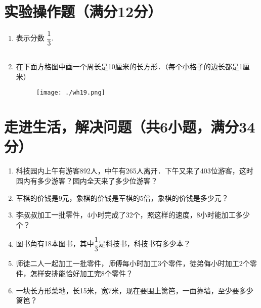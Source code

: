 \documentclass[12pt,twoside,space]{ctexart}
\begin{document}
    \newpage
    \section{实验操作题（满分12分）}
      \begin{enumerate}[itemsep=0.2em, topsep=0pt]
        \item 表示分数 $\dfrac{1}{3}$.\\[0.5em]
            \begin{tabular}{|l|l|l|l|l|l|l|l|l|l|l|l|}
            \hline
              \hspace{1em} & \hspace{1em} & \hspace{1em} & \hspace{1em} & \hspace{1em} & \hspace{1em} & \hspace{1em} & \hspace{1em} & \hspace{1em} & \hspace{1em} &  \hspace{1em} & \hspace{1em} \\ \hline
            \end{tabular}

          \item 在下面方格图中画一个周长是10厘米的长方形．（每个小格子的边长都是1厘米）
            \begin{figure}[H]
              \centering
              \texttt{[image: ./wh19.png]}
            \end{figure}
      \end{enumerate}

    \section{走进生活，解决问题（共6小题，满分34分）}
      \begin{enumerate}[itemsep=4em,topsep=0pt]
        \item 科技园内上午有游客892人，中午有265人离开．下午又来了403位游客，这时园内有多少游客？园内全天来了多少位游客？
        \item 军棋的价钱是9元，象棋的价钱是军棋的5倍，象棋的价钱是多少元？
        \item 李叔叔加工一批零件，4小时完成了32个，照这样的速度，8小时能加工多少个？
        \item 图书角有18本图书，其中$\dfrac{1}{3}$是科技书，科技书有多少本？
        \item 师徒二人一起加工一批零件，师傅每小时加工3个零件，徒弟侮小时加工2个零件，怎样安排能恰好加工完8个零件？
        \item 一块长方形菜地，长15米，宽7米，现在要围上篱笆，一面靠墙，至少要多少篱笆？
      \end{enumerate}
\end{document}

